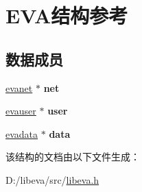 \hypertarget{struct_e_v_a}{\section{\-E\-V\-A结构参考}
\label{struct_e_v_a}
}
\subsection*{数据成员}
\begin{DoxyCompactItemize}
\item 
\hypertarget{struct_e_v_a_a04c9b80a50f14e555cd6af3cc825b758}{\hyperlink{struct__eavnet__}{evanet} $\ast$ {\bfseries net}}\label{struct_e_v_a_a04c9b80a50f14e555cd6af3cc825b758}

\item 
\hypertarget{struct_e_v_a_a23b27034ed802374571d8a1e26cc9f38}{\hyperlink{structevauser}{evauser} $\ast$ {\bfseries user}}\label{struct_e_v_a_a23b27034ed802374571d8a1e26cc9f38}

\item 
\hypertarget{struct_e_v_a_a3932f0150290e713de2de5eb36640ebd}{\hyperlink{structevadata}{evadata} $\ast$ {\bfseries data}}\label{struct_e_v_a_a3932f0150290e713de2de5eb36640ebd}

\end{DoxyCompactItemize}


该结构的文档由以下文件生成：\begin{DoxyCompactItemize}
\item 
\-D\-:/libeva/src/\hyperlink{libeva_8h}{libeva.\-h}\end{DoxyCompactItemize}
